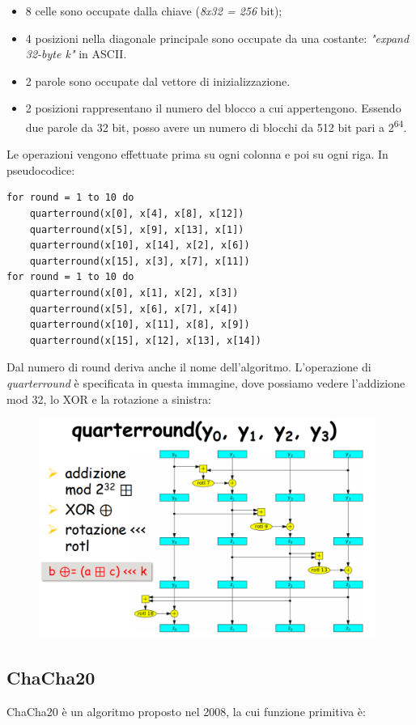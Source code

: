 \begin{itemize}
    \item 8 celle sono occupate dalla chiave (\textit{8x32 = 256} bit);
    \item 4 posizioni nella diagonale principale sono occupate da una costante: \textit{"expand 32-byte k"} in ASCII.
    \item 2 parole sono occupate dal vettore di inizializzazione.
    \item 2 posizioni rappresentano il numero del blocco a cui appertengono. Essendo due parole da 32 bit, posso avere un numero di blocchi da 512 bit pari a 2\textsuperscript{64}.
\end{itemize}
Le operazioni vengono effettuate prima su ogni colonna e poi su ogni riga. In pseudocodice:
\begin{lstlisting}
for round = 1 to 10 do
    quarterround(x[0], x[4], x[8], x[12])
    quarterround(x[5], x[9], x[13], x[1])
    quarterround(x[10], x[14], x[2], x[6])
    quarterround(x[15], x[3], x[7], x[11])
for round = 1 to 10 do
    quarterround(x[0], x[1], x[2], x[3])
    quarterround(x[5], x[6], x[7], x[4])
    quarterround(x[10], x[11], x[8], x[9])
    quarterround(x[15], x[12], x[13], x[14])
\end{lstlisting}
Dal numero di round deriva anche il nome dell'algoritmo. L'operazione di \textit{quarterround} è specificata in questa immagine, dove possiamo vedere l'addizione mod 32, lo XOR e la rotazione a sinistra:

\begin{figure}[htb!]
    \centering
    \includegraphics[width=11cm]{./Images/cap1/1.39.png}
\end{figure} 

\subsection{ChaCha20}
ChaCha20 è un algoritmo proposto nel 2008, la cui funzione primitiva è:

